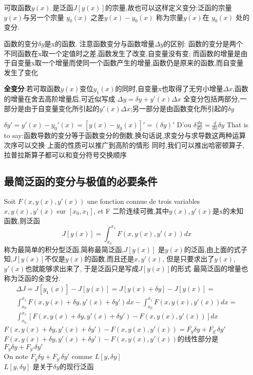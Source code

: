 \documentclass{book}
\begin{document}
可取函数$y(x)$ 是泛函$J[y(x)]$的宗量,故也可以这样定义变分:泛函的宗量$y(x)$与另一个宗量 $y_0(x)$ 之差$y(x)-y_0(x)$ 称为宗量$y(x)$在 $y_0(x)$ 处的变分.

\begin{attention}
函数的变分$\delta y$是x的函数.\newline
注意函数变分与函数增量$\Delta y$的区别:\newline
函数的变分是两个不同函数在x取一个定值时之差,函数发生了改变,自变量没有变;\newline
而函数的增量是由于自变量x取一个增量而使同一个函数产生的增量,函数仍是原来的函数,而自变量发生了变化
\end{attention}

\textbf{全变分}:若可取函数$y(x)$变位$y_1(x)$的同时,自变量x也取得了无穷小增量$\Delta x$,函数的增量在舍去高阶增量后,可近似写成\newline
$\Delta y=\delta y + y'(x)\Delta x$
\newline
全变分包括两部分,一部分是由于自变量变化所引起的$y'(x)\Delta x$;另一部分是由函数变化所引起的$\delta y $

$\delta y'=y'(x)-y_0'(x)=[y(x)-y_0(x)]'=(\delta y)'$
D'ou $\delta \frac{dy}{dx}=\frac{d}{dx}\delta y$
\newline
That is to say:函数导数的变分等于函数变分的倒数,换句话说,求变分与求导数这两种运算次序可以交换
\newline
上面的性质可以推广到高阶的情形
同时,我们可以推出哈密顿算子,拉普拉斯算子都可以和变分符号交换顺序

\subsection{最简泛函的变分与极值的必要条件}
Soit $F(x,y(x),y'(x))$ une fonction connue de trois variables $x,y(x),y'(x)$ sur $[x_0,x_1]$, et F 二阶连续可微,其中$y(x),y'(x)$是x的未知函数,则泛函 \newline
$$J[y(x)]=\int_{x_0}^{x_1}F(x,y(x),y'(x))dx$$
称为最简单的积分型泛函,简称最简泛函,$J[y(x)]$ 是$y(x)$的泛函,由上面的式子知,$J[y(x)]$不仅是$y(x)$的函数,而且还是$x,y'(x)$,
但是只要求出了$y(x)$, $y'(x)$也就能够求出来了, 于是泛函只是写成$J[y(x)]$的形式 \newline
最简泛函的增量也称为泛函的全变分.
\begin{equation}
\begin{split}
  \Delta J=J[y_1(x)]-J[y(x)]=J[y(x)+\delta y]-J[y(x)]= \\
\int_{x_0}^{x_1}F(x,y(x)+\delta y,y'(x)+\delta y')dx-\int_{x_0}^{x_1}F(x,y(x),y'(x))dx = \\
\int_{x_0}^{x_1}[F(x,y(x)+\delta y,y'(x)+\delta y')-F(x,y(x),y'(x))]dx
 \end{split}
\end{equation}
$F(x,y(x)+\delta y,y'(x)+\delta y')-F(x,y(x),y'(x))=\overline{F_y}\delta y + \overline{F_{y'}}\delta y'$ \newline
$F(x,y(x)+\delta y,y'(x)+\delta y')-F(x,y(x),y'(x))$的线性部分是$F_y\delta y + F_{y'}\delta y'$ \\
On note $F_y\delta y + F_{y'}\delta y'$ comme $L[y,\delta y]$ \\
$L[y,\delta y]$ 是关于$\delta y$的现行泛函
\end{document}
